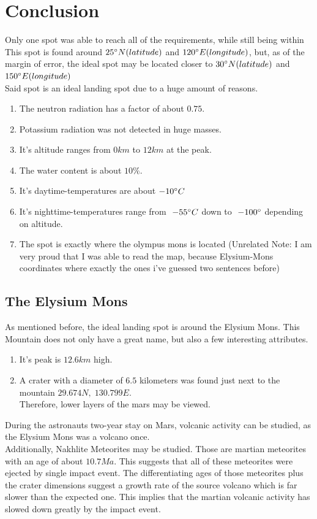 \documentclass{article}
\begin{document}
\section{Conclusion}
Only one spot was able to reach all of the requirements, while still being within
This spot is found around \(25 \degree N (latitude)\) and \(120 \degree E (longitude)\), but, as of the margin of error, the ideal spot may be located closer to \(30 \degree N (latitude)\) and \(150 \degree E (longitude)\)  \\
Said spot is an ideal landing spot due to a huge amount of reasons.
\begin{enumerate}
    \item The neutron radiation has a factor of about \(0.75\). \\
    \item Potassium radiation was not detected in huge masses.
    \item It's altitude ranges from \(0km\) to \(12km\) at the peak.
    \item The water content is about \(10\%\).
    \item It's daytime-temperatures are about \(-10 \degree C\)
    \item It's nighttime-temperatures range from \(~-55 \degree C\) down to \(~-100 \degree\) depending on altitude. 
    \item The spot is exactly where the olympus mons is located (Unrelated Note: I am very proud that I was able to read the map, because Elysium-Mons coordinates where exactly the ones i've guessed two sentences before)
\end{enumerate}

\subsection{The Elysium Mons}
As mentioned before, the ideal landing spot is around the Elysium Mons.
This Mountain does not only have a great name, but also a few interesting attributes.
\begin{enumerate}
    \item It's peak is \(12.6km\) high.
    \item A crater with a diameter of \(6.5\) kilometers was found just next to the mountain \(29.674N, \; 130.799E\). \\ Therefore, lower layers of the mars may be viewed.
\end{enumerate}

During the astronauts two-year stay on Mars, volcanic activity can be studied, as the Elysium Mons was a volcano once.
\\
Additionally, Nakhlite Meteorites may be studied. 
Those are martian meteorites with an age of about \(10.7 Ma\).
This suggests that all of these meteorites were ejected by single impact event.
The differentiating ages of those meteorites plus the crater dimensions suggest a growth rate of the source volcano which is far slower than the expected one.
This implies that the martian volcanic activity has slowed down greatly by the impact event.
\end{document}
